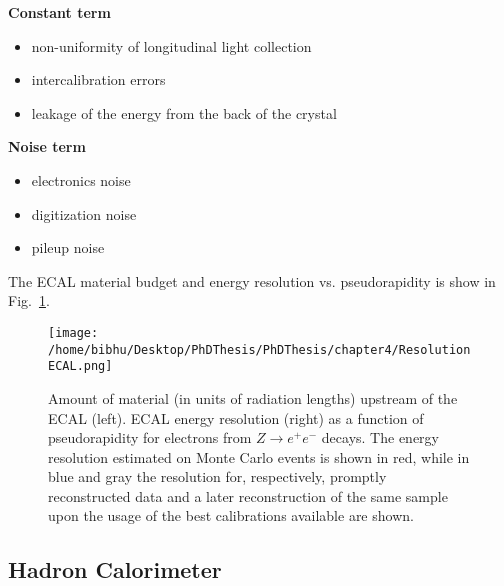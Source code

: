 {\bf Constant term}
\vspace{-0.2in}
\begin{itemize}

\item non-uniformity of longitudinal light collection \vspace{-0.2in}

\item intercalibration errors \vspace{-0.2in}

\item leakage of the energy from the back of the crystal \vspace{-0.2in}

\end{itemize} 


{\bf Noise term}
\vspace{-0.2in}

\begin{itemize}

\item electronics noise \vspace{-0.2in}

\item digitization noise \vspace{-0.2in}

\item pileup noise \vspace{-0.2in}
\end{itemize} 

The ECAL material budget and energy resolution vs. pseudorapidity is show in Fig.~\ref{fig:ResolutionECAL}.

\begin{figure}[H]
    \centering  
    \texttt{[image: /home/bibhu/Desktop/PhDThesis/PhDThesis/chapter4/ResolutionECAL.png]}
    \caption{ \small Amount of material (in units of radiation lengths) upstream of the ECAL (left). ECAL energy
resolution (right) as a function of pseudorapidity for electrons from $Z\rightarrow e^{+}e^{-}$ decays. The energy resolution
estimated on Monte Carlo events is shown in red, while in blue and gray the resolution for, respectively, promptly reconstructed
data and a later reconstruction of the same sample upon the usage of the best calibrations
available are shown.}
    \label{fig:ResolutionECAL}
\end{figure}



\subsection{Hadron Calorimeter}

